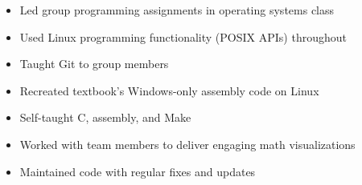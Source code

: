 \documentclass[10pt]{article}
\begin{document}
	\begin{itemize}[noitemsep,topsep=0.25em]
		\item Led group programming assignments in operating systems class
		\item Used Linux programming functionality (POSIX APIs) throughout
		\item Taught Git to group members
	\end{itemize}


	\begin{itemize}[noitemsep,topsep=0.25em]
		\item Recreated textbook's Windows-only assembly code on Linux
		\item Self-taught C, assembly, and Make
	\end{itemize}


	\begin{itemize}[noitemsep,topsep=0.25em]
		\item Worked with team members to deliver engaging math visualizations
	\end{itemize}


	\begin{itemize}[noitemsep,topsep=0.25em]
		\item Maintained code with regular fixes and updates
	\end{itemize}
\end{document}
